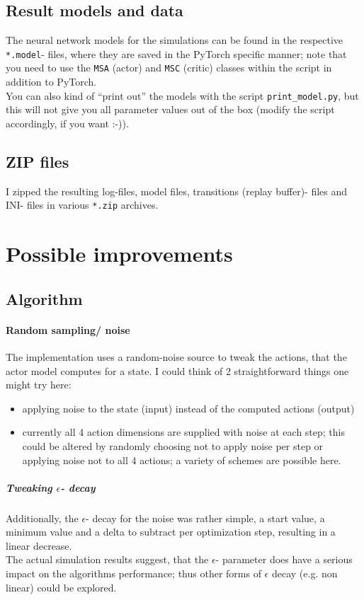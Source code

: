 \documentclass[a4paper]{article}
\begin{document}
\subsection{Result models and data}
The neural network models for the simulations can be found in the respective
\texttt{*.model}- files, where they are saved in the PyTorch specific manner;
note that you need to use the \texttt{MSA} (actor) and \texttt{MSC} (critic)
classes within the script in addition to PyTorch.
\\
You can also kind of \enquote{print out} the models with the script
\texttt{print\_model.py}, but this will not give you all parameter values
out of the box (modify the script accordingly, if you want :-)).
\\
\subsection{ZIP files}
I zipped the resulting log-files, model files, transitions (replay buffer)- files
and INI- files in various \texttt{*.zip} archives.

\section{Possible improvements}
\subsection{Algorithm}
\paragraph{Random sampling/ noise}
The implementation uses a random-noise source to tweak the actions, that the
actor model computes for a state. I could think of 2 straightforward things one might try here:
\begin{itemize}
\item applying noise to the state (input) instead of the computed actions (output)
\item currently all 4 action dimensions are supplied with noise at each step;
this could be altered by randomly choosing not to apply noise per step or
applying noise not to all 4 actions; a variety of schemes are possible here.
\end{itemize}

\subparagraph{Tweaking $\epsilon$- decay}
Additionally, the $\epsilon$- decay for the noise was rather simple, a start value,
a minimum value and a delta to subtract per optimization step,
resulting in a linear decrease.
\\
The actual simulation results suggest, that the $\epsilon$- parameter
does have a serious impact on the algorithms performance;
thus other forms of $\epsilon$ decay (e.g. non linear) could be explored.
\end{document}
